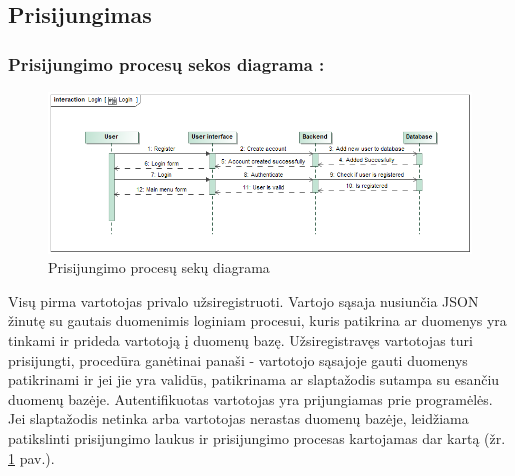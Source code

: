 \documentclass{VUMIFPSkursinis}
\begin{document}
	\subsection{Prisijungimas}
		\subsubsection*{Prisijungimo procesų sekos diagrama :}
		\begin{figure}[H]
			\centering
			\includegraphics[scale=0.5]{img/Login_sequence}
			\caption{Prisijungimo procesų sekų diagrama}
			\label{img:Login_sequence}
		\end{figure}
		Visų pirma vartotojas privalo užsiregistruoti. Vartojo sąsaja nusiunčia JSON 
		žinutę su gautais duomenimis loginiam procesui, kuris patikrina ar duomenys yra tinkami ir
		prideda vartotoją į duomenų bazę. Užsiregistravęs vartotojas turi prisijungti,
		procedūra ganėtinai panaši - vartotojo sąsajoje gauti duomenys patikrinami ir 
		jei jie yra validūs, patikrinama ar slaptažodis sutampa su esančiu duomenų
		bazėje. Autentifikuotas vartotojas yra prijungiamas prie programėlės. 
		Jei slaptažodis netinka arba vartotojas nerastas duomenų bazėje, leidžiama
		patikslinti prisijungimo laukus ir prisijungimo procesas kartojamas dar kartą (žr. \ref{img:Login_sequence} pav.).
\end{document}
